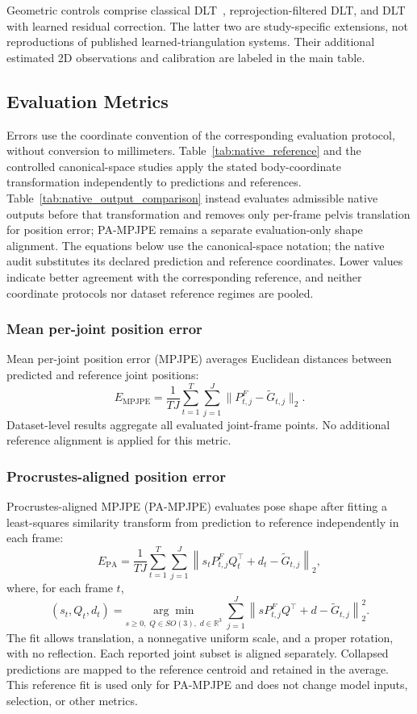 \documentclass[preprint,12pt]{elsarticle}
\begin{document}
Geometric controls comprise classical DLT~\cite{hartley2004multiple}, reprojection-filtered DLT, and DLT with learned residual correction. The latter two are study-specific extensions, not reproductions of published learned-triangulation systems. Their additional estimated 2D observations and calibration are labeled in the main table.

\subsection{Evaluation Metrics}

Errors use the coordinate convention of the corresponding evaluation protocol, without conversion to millimeters. Table~\ref{tab:native_reference} and the controlled canonical-space studies apply the stated body-coordinate transformation independently to predictions and references. Table~\ref{tab:native_output_comparison} instead evaluates admissible native outputs before that transformation and removes only per-frame pelvis translation for position error; PA-MPJPE remains a separate evaluation-only shape alignment. The equations below use the canonical-space notation; the native audit substitutes its declared prediction and reference coordinates. Lower values indicate better agreement with the corresponding reference, and neither coordinate protocols nor dataset reference regimes are pooled.

\subsubsection{Mean per-joint position error}
Mean per-joint position error (MPJPE) averages Euclidean distances between predicted and reference joint positions:
\[
E_{\mathrm{MPJPE}}=\frac{1}{TJ}\sum_{t=1}^{T}\sum_{j=1}^{J}\|P^F_{t,j}-\tilde{G}_{t,j}\|_2.
\]
Dataset-level results aggregate all evaluated joint-frame points. No additional reference alignment is applied for this metric.

\subsubsection{Procrustes-aligned position error}
Procrustes-aligned MPJPE (PA-MPJPE) evaluates pose shape after fitting a least-squares similarity transform from prediction to reference independently in each frame:
\[
E_{\mathrm{PA}}=\frac{1}{TJ}\sum_{t=1}^{T}\sum_{j=1}^{J}\left\|s_t P^F_{t,j}Q_t^{\top}+d_t-\tilde{G}_{t,j}\right\|_2,
\]
where, for each frame \(t\),
\[
(s_t,Q_t,d_t)=\underset{s\geq0,\;Q\in SO(3),\;d\in\mathbb{R}^3}{\arg\min}\;\sum_{j=1}^{J}\left\|sP^F_{t,j}Q^{\top}+d-\tilde{G}_{t,j}\right\|_2^2 .
\]
The fit allows translation, a nonnegative uniform scale, and a proper rotation, with no reflection. Each reported joint subset is aligned separately. Collapsed predictions are mapped to the reference centroid and retained in the average. This reference fit is used only for PA-MPJPE and does not change model inputs, selection, or other metrics.
\end{document}
